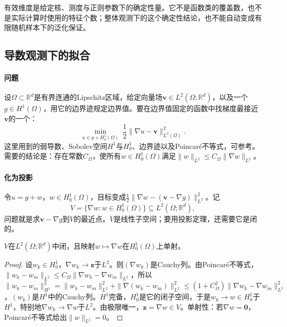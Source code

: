有效维度是给定核、测度与正则参数下的确定性量。它不是函数类的覆盖数，也不是实际计算时使用的特征个数；整体观测下的这个确定性结论，也不能自动变成有限随机样本下的泛化保证。

\subsection{导数观测下的拟合}
\label{sec:opt-fit-gradient-observations}

\paragraph{问题}
设$\Omega\subset\mathbb R^d$是有界连通的Lipschitz区域，给定向量场$\bm v\in L^2(\Omega;\mathbb R^d)$，以及一个$g\in H^1(\Omega)$，用它的边界迹规定边界值。要在边界值固定的函数中找梯度最接近$\bm v$的一个：
\begin{equation}
  \min_{u\in g+H_0^1(\Omega)}\ \frac12\|\nabla u-\bm v\|_{L^2(\Omega)}^2 .
  \label{eq:opt-fit-gradient-problem}
\end{equation}
这里用到的弱导数、Sobolev空间$H^1$与$H_0^1$、边界迹以及Poincaré不等式，可参考。需要的结论是：存在常数$C_\Omega$，使所有$w\in H_0^1(\Omega)$满足$\|w\|_{L^2}\le C_\Omega\|\nabla w\|_{L^2}$。

\paragraph{化为投影}
令$u=g+w$，$w\in H_0^1(\Omega)$，目标变成$\tfrac12\|\nabla w-(\bm v-\nabla g)\|_{L^2}^2$。记
\[
  V=\{\nabla w:w\in H_0^1(\Omega)\}\subseteq L^2(\Omega;\mathbb R^d),
\]
问题就是求$\bm v-\nabla g$到$V$的最近点。$V$是线性子空间；要用投影定理，还需要它是闭的。

\begin{lemma}[梯度像是闭子空间]
\label{lem:opt-fit-gradient-closed}
$V$在$L^2(\Omega;\mathbb R^d)$中闭，且映射$w\mapsto\nabla w$在$H_0^1(\Omega)$上单射。
\end{lemma}

\begin{proof}
设$w_k\in H_0^1$，$\nabla w_k\to\bm z$于$L^2$。则$(\nabla w_k)$是Cauchy列。由Poincaré不等式，$\|w_k-w_m\|_{L^2}\le C_\Omega\|\nabla w_k-\nabla w_m\|_{L^2}$，所以$\|w_k-w_m\|_{H^1}^2=\|w_k-w_m\|_{L^2}^2+\|\nabla(w_k-w_m)\|_{L^2}^2\le(1+C_\Omega^2)\|\nabla w_k-\nabla w_m\|_{L^2}^2$，$(w_k)$是$H^1$中的Cauchy列。$H^1$完备，$H_0^1$是它的闭子空间，于是$w_k\to w\in H_0^1$于$H^1$，特别地$\nabla w_k\to\nabla w$于$L^2$。由极限唯一，$\bm z=\nabla w\in V$。单射性：若$\nabla w=\bm 0$，Poincaré不等式给出$\|w\|_{L^2}=0$。
\end{proof}


